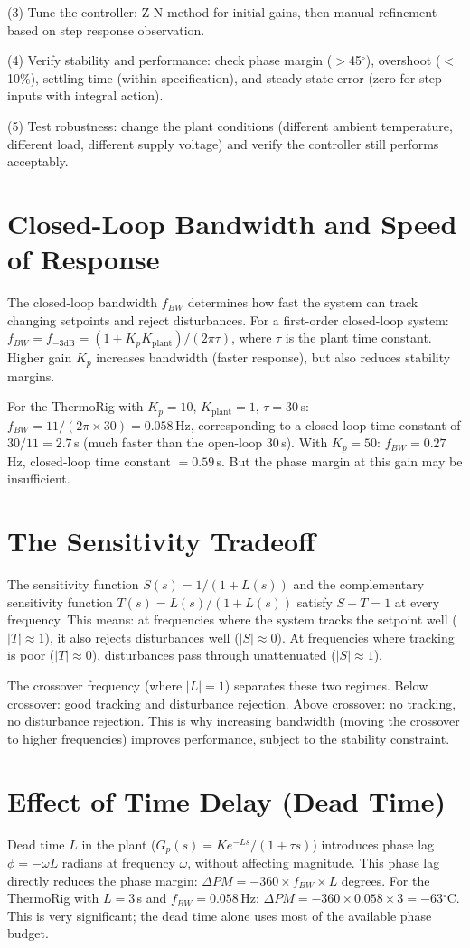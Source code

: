 \documentclass[11pt,letterpaper,twoside,openany]{book}
\newcommand{\degC}{\ensuremath{{}^{\circ}\text{C}}}
\begin{document}
(3) Tune the controller: Z-N method for initial gains, then manual refinement based on step response observation.

(4) Verify stability and performance: check phase margin ($>$45$^\circ$), overshoot ($<$10\%), settling time (within specification), and steady-state error (zero for step inputs with integral action).

(5) Test robustness: change the plant conditions (different ambient temperature, different load, different supply voltage) and verify the controller still performs acceptably.
\section{Closed-Loop Bandwidth and Speed of Response}
The closed-loop bandwidth $f_{BW}$ determines how fast the system can track changing setpoints and reject disturbances. For a first-order closed-loop system: $f_{BW} = f_{-3\text{dB}} = (1+K_p K_{\text{plant}}) / (2\pi\tau)$, where $\tau$ is the plant time constant. Higher gain $K_p$ increases bandwidth (faster response), but also reduces stability margins.

For the ThermoRig with $K_p = 10$, $K_{\text{plant}} = 1$, $\tau = 30$\,s: $f_{BW} = 11/(2\pi \times 30) = 0.058$\,Hz, corresponding to a closed-loop time constant of $30/11 = 2.7$\,s (much faster than the open-loop 30\,s). With $K_p = 50$: $f_{BW} = 0.27$\,Hz, closed-loop time constant $= 0.59$\,s. But the phase margin at this gain may be insufficient.

\section{The Sensitivity Tradeoff}
The sensitivity function $S(s) = 1/(1 + L(s))$ and the complementary sensitivity function $T(s) = L(s)/(1+L(s))$ satisfy $S + T = 1$ at every frequency. This means: at frequencies where the system tracks the setpoint well ($|T| \approx 1$), it also rejects disturbances well ($|S| \approx 0$). At frequencies where tracking is poor ($|T| \approx 0$), disturbances pass through unattenuated ($|S| \approx 1$).

The crossover frequency (where $|L| = 1$) separates these two regimes. Below crossover: good tracking and disturbance rejection. Above crossover: no tracking, no disturbance rejection. This is why increasing bandwidth (moving the crossover to higher frequencies) improves performance, subject to the stability constraint.

\section{Effect of Time Delay (Dead Time)}
Dead time $L$ in the plant ($G_p(s) = K e^{-Ls}/(1+\tau s)$) introduces phase lag $\phi = -\omega L$ radians at frequency $\omega$, without affecting magnitude. This phase lag directly reduces the phase margin: $\Delta PM = -360 \times f_{BW} \times L$ degrees. For the ThermoRig with $L = 3$\,s and $f_{BW} = 0.058$\,Hz: $\Delta PM = -360 \times 0.058 \times 3 = -63$\degC{}. This is very significant; the dead time alone uses most of the available phase budget.
\end{document}
